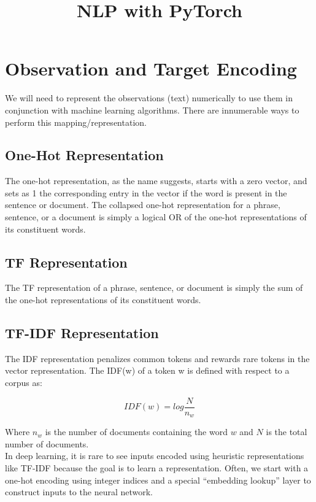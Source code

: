 \documentclass[french]{article}
\title{NLP with PyTorch}
\begin{document}
\date{}

\maketitle

\section{Observation and Target Encoding}

We will need to represent the observations (text) numerically to use them in conjunction with machine learning algorithms. There are innumerable ways to perform this mapping/representation.

\subsection{One-Hot Representation}

The one-hot representation, as the name suggests, starts with a zero vector, and sets as 1 the corresponding entry in the vector if the word is present in the sentence or document.
The collapsed one-hot representation for a phrase, sentence, or a document is simply a logical OR of the one-hot representations of its constituent words.

\subsection{TF Representation}

The TF representation of a phrase, sentence, or document is simply the sum of the one-hot representations of its constituent words.

\subsection{TF-IDF Representation}

The IDF representation penalizes common tokens and rewards rare tokens in the vector representation. The IDF(w) of a token w is defined with respect to a corpus as:

\[IDF(w) = log \frac{N}{n_w}\]

Where $n_w$ is the number of documents containing the word $w$ and $N$ is the total number of documents.\\

In deep learning, it is rare to see inputs encoded using heuristic representations like TF-IDF because the goal is to learn a representation. Often, we start with a one-hot encoding using integer indices and a special “embedding lookup” layer to construct inputs to the neural network.
\end{document}
